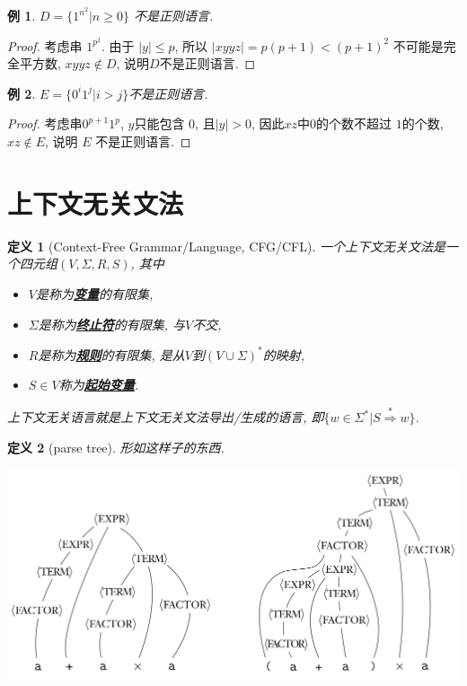 \documentclass[8pt]{article}
\theoremstyle{compact}
\newtheorem{definition}{定义}
\newtheorem{example}{例}
\def\obj#1{\textbf{\uline{#1}}}
\def\le{\leqslant}
\def\ge{\geqslant}
\begin{document}
\begin{example}
	$D = \{1^{n^2} | n \ge 0\}$ 不是正则语言.
\end{example}
\begin{proof}
	考虑串 $1^{p^2}$. 由于 $|y| \le p$, 所以 $|xyyz| = p(p+1) < (p+1)^2$ 不可能是完全平方数, $xyyz \notin D$, 说明$D$不是正则语言.
\end{proof}
\begin{example}
	$E = \{0^i1^j | i > j\}$不是正则语言. 
\end{example}
\begin{proof}
	考虑串$0^{p+1}1^p$, $y$只能包含 $0$, 且$|y| > 0$, 因此$xz$中$0$的个数不超过 $1$的个数, $xz \notin E$, 说明 $E$ 不是正则语言.
\end{proof}
\newpage
\section{上下文无关文法}
\begin{definition}[Context-Free Grammar/Language, CFG/CFL]
	一个上下文无关文法是一个四元组$(V, \Sigma, R, S)$, 其中
	\begin{itemize}
		\item $V$是称为\obj{变量}的有限集, 
		\item $\Sigma$是称为\obj{终止符}的有限集, 与$V$不交, 
		\item $R$是称为\obj{规则}的有限集, 是从$V$到$(V \cup \Sigma)^*$的映射, 
		\item $S \in V$称为\obj{起始变量}. 
	\end{itemize}

	上下文无关语言就是上下文无关文法导出/生成的语言, 即$\{w \in \Sigma^* | S \overset{*}{\Rightarrow} w\}$. 
\end{definition}
\begin{definition}[parse tree]
	形如这样子的东西.
	\begin{center}
		\includegraphics*[scale=0.4]{pic/parse_tree.png}	
	\end{center}
\end{definition}
\end{document}

